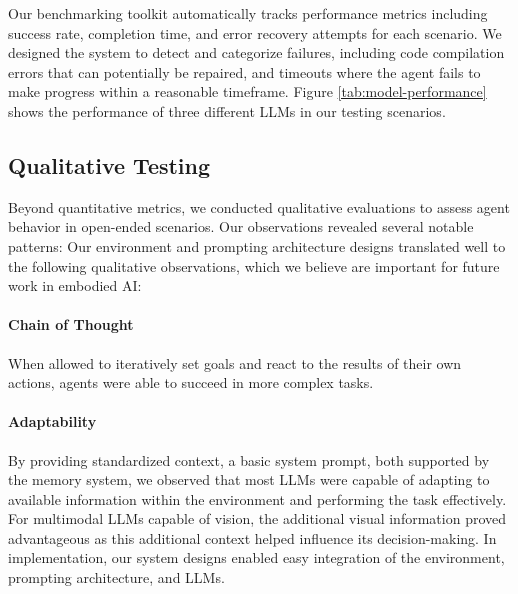 \documentclass{article}
\begin{document}
Our benchmarking toolkit automatically tracks performance metrics including success rate, completion time, and error recovery attempts for each scenario. 
We designed the system to detect and categorize failures, including code compilation errors that can potentially be repaired, and timeouts where the agent fails to make progress within a reasonable timeframe.
Figure \ref{tab:model-performance} shows the performance of three different LLMs in our testing scenarios.

\subsection{Qualitative Testing}
Beyond quantitative metrics, we conducted qualitative evaluations to assess agent behavior in open-ended scenarios. Our observations revealed several notable patterns:
Our environment and prompting architecture designs translated well to the following qualitative observations, which we believe are important for future work in embodied AI:
\paragraph{Chain of Thought} When allowed to iteratively set goals and react to the results of their own actions, agents were able to succeed in more complex tasks.
\paragraph{Adaptability} By providing standardized context, a basic system prompt, both supported by the memory system, we observed that most LLMs were capable of adapting to available information within the environment and performing the task effectively.
For multimodal LLMs capable of vision, the additional visual information proved advantageous as this additional context helped influence its decision-making.
In implementation, our system designs enabled easy integration of the environment, prompting architecture, and LLMs.
\end{document}
